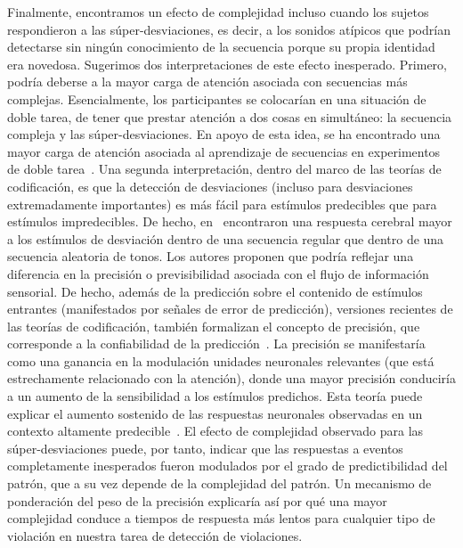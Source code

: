 Finalmente, encontramos un efecto de complejidad incluso cuando los sujetos respondieron a las súper-desviaciones, es decir, a los sonidos atípicos que podrían detectarse sin ningún conocimiento de la secuencia porque su propia identidad era novedosa. Sugerimos dos interpretaciones de este efecto inesperado. Primero, podría deberse a la mayor carga de atención asociada con secuencias más complejas. Esencialmente, los participantes se colocarían en una situación de doble tarea, de tener que prestar atención a dos cosas en simultáneo: la secuencia compleja y las súper-desviaciones. En apoyo de esta idea, se ha encontrado una mayor carga de atención asociada al aprendizaje de secuencias en experimentos de doble tarea~\cite{f125}. Una segunda interpretación, dentro del marco de las teorías de codificación, es que la detección de desviaciones (incluso para desviaciones extremadamente importantes) es más fácil para estímulos predecibles que para estímulos impredecibles. De hecho, en~\cite{f128} encontraron una respuesta cerebral mayor a los estímulos de desviación dentro de una secuencia regular que dentro de una secuencia aleatoria de tonos. Los autores proponen que podría reflejar una diferencia en la precisión o previsibilidad asociada con el flujo de información sensorial. De hecho, además de la predicción sobre el contenido de estímulos entrantes (manifestados por señales de error de predicción), versiones recientes de las teorías de codificación, también formalizan el concepto de precisión, que corresponde a la confiabilidad de la predicción~\cite{f80,f129,f130,f131,f132}. La precisión se manifestaría como una ganancia en la modulación unidades neuronales relevantes (que está estrechamente relacionado con la atención), donde una mayor precisión conduciría a un aumento de la sensibilidad a los estímulos predichos. Esta teoría puede explicar el aumento sostenido de las respuestas neuronales observadas en un contexto altamente predecible~\cite{f126,f128,f129,f133}. El efecto de complejidad observado para las súper-desviaciones puede, por tanto, indicar que las respuestas a eventos completamente inesperados fueron modulados por el grado de predictibilidad del patrón, que a su vez depende de la complejidad del patrón. Un mecanismo de ponderación del peso de la precisión explicaría así por qué una mayor complejidad conduce a tiempos de respuesta más lentos para cualquier tipo de violación en nuestra tarea de detección de violaciones.


